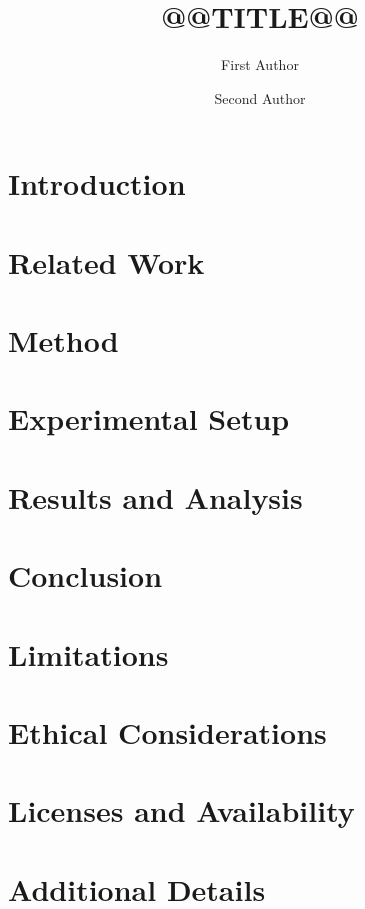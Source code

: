 \documentclass[11pt]{article}
\title{@@TITLE@@}
\author{First Author \and Second Author}
\date{}
\newif\ifcameraready
\newcommand{\camerareadyonly}[1]{\ifcameraready #1\fi}
\begin{document}
\maketitle

\begin{abstract}

\end{abstract}

\section{Introduction}\label{sec:intro}


\section{Related Work}\label{sec:related}


\section{Method}\label{sec:method}


\section{Experimental Setup}\label{sec:setup}


\section{Results and Analysis}\label{sec:results}


\section{Conclusion}\label{sec:conclusion}


\section*{Limitations}


\section*{Ethical Considerations}


\section*{Licenses and Availability}


\camerareadyonly{%
\section*{Author Contributions}

\section*{Acknowledgments}

}




\appendix
\section{Additional Details}\label{sec:appendix}

\end{document}
